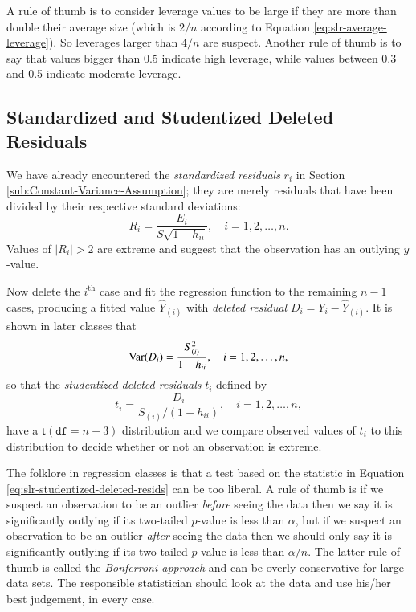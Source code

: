 \documentclass[captions=tableheading]{scrbook}
\begin{document}
A rule of thumb is to consider leverage values to be large if they are more than double their average size (which is \(2/n\) according to Equation \ref{eq:slr-average-leverage}). So leverages larger than \(4/n\) are suspect. Another rule of thumb is to say that values bigger than 0.5 indicate high leverage, while values between 0.3 and 0.5 indicate moderate leverage.
\subsection{Standardized and Studentized Deleted Residuals}
\label{sec-1-5-3}


We have already encountered the \emph{standardized residuals} \(r_{i}\) in Section \ref{sub:Constant-Variance-Assumption}; they are merely residuals that have been divided by their respective standard deviations: 
\begin{equation}
R_{i}=\frac{E_{i}}{S\sqrt{1-h_{ii}}},\quad i=1,2,\ldots,n.
\end{equation}
Values of \(|R_{i}| > 2\) are extreme and suggest that the observation has an outlying \(y\)-value. 

Now delete the \(i^{\mathrm{th}}\) case and fit the regression function to the remaining \(n - 1\) cases, producing a fitted value \(\hat{Y}_{(i)}\) with \emph{deleted residual} \(D_{i}=Y_{i}-\hat{Y}_{(i)}\). It is shown in later classes that 
\begin{equation}
\mbox{Var\ensuremath{(D_{i})}}=\frac{S_{(i)}^{2}}{1-h_{ii}},\quad i=1,2,\ldots,n,
\end{equation}
so that the \emph{studentized deleted residuals} \(t_{i}\) defined by
\begin{equation}
t_{i}=\frac{D_{i}}{S_{(i)}/(1-h_{ii})},\quad i=1,2,\ldots,n,\label{eq:slr-studentized-deleted-resids}
\end{equation}
have a \(\mathsf{t}(\mathtt{df}=n-3)\) distribution and we compare observed values of \(t_{i}\) to this distribution to decide whether or not an observation is extreme. 

The folklore in regression classes is that a test based on the statistic in Equation \ref{eq:slr-studentized-deleted-resids} can be too liberal. A rule of thumb is if we suspect an observation to be an outlier \emph{before} seeing the data then we say it is significantly outlying if its two-tailed \(p\)-value is less than \(\alpha\), but if we suspect an observation to be an outlier \emph{after} seeing the data then we should only say it is significantly outlying if its two-tailed \(p\)-value is less than \(\alpha/n\). The latter rule of thumb is called the \emph{Bonferroni approach} and can be overly conservative for large data sets. The responsible statistician should look at the data and use his/her best judgement, in every case.
\end{document}
